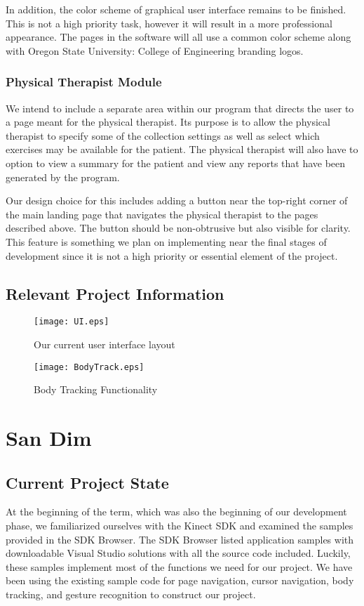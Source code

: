 \documentclass[onecolumn, draftclsnofoot,10pt, compsoc]{IEEEtran}
\begin{document}
In addition, the color scheme of graphical user interface remains to be finished. This is not a high priority task, however it will result in a more professional appearance. The pages in the software will all use a common color scheme along with Oregon State University: College of Engineering branding logos. 

\subsubsection{Physical Therapist Module}
We intend to include a separate area within our program that directs the user to a page meant for the physical therapist. Its purpose is to allow the physical therapist to specify some of the collection settings as well as select which exercises may be available for the patient. The physical therapist will also have to option to view a summary for the patient and view any reports that have been generated by the program.

Our design choice for this includes adding a button near the top-right corner of the main landing page that navigates the physical therapist to the pages described above. The button should be non-obtrusive but also visible for clarity. This feature is something we plan on implementing near the final stages of development since it is not a high priority or essential element of the project.

\subsection{Relevant Project Information}
\begin{figure}[H]
  \texttt{[image: UI.eps]}
  \caption{Our current user interface layout}
    \label{fig:UI}
\end{figure}

\begin{figure}[H]
  \texttt{[image: BodyTrack.eps]}
  \caption{Body Tracking Functionality}
    \label{fig:BodyTrack}
\end{figure}

\section{San Dim}
\subsection{Current Project State}
At the beginning of the term, which was also the beginning of our development phase, we familiarized ourselves with the Kinect SDK and examined the samples provided in the SDK Browser. The SDK Browser listed application samples with downloadable Visual Studio solutions with all the source code included. Luckily, these samples implement most of the functions we need for our project. We have been using the existing sample code for page navigation, cursor navigation, body tracking, and gesture recognition to construct our project.
\end{document}
